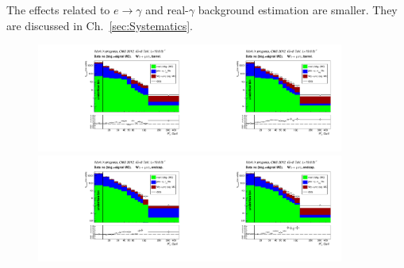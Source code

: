 The effects related to $e\rightarrow\gamma$ and real-$\gamma$ background estimation are smaller. They are discussed in Ch.~\ref{sec:Systematics}.

\begin{figure}[htb]
  \begin{center}
   \includegraphics[width=0.45\textwidth]{../figs/figs_v11/MUON_WGamma/PrepareYields/c_DATAvsBkgPlusSigMCc_MUON_WGamma_TEMPL_CHISO_UNblind__Barrel__phoEt.pdf}\includegraphics[width=0.45\textwidth]{../figs/figs_v11/MUON_WGamma/PrepareYields/c_DATAvsBkgPlusSigMCc_MUON_WGamma_TEMPL_SIHIH_UNblind__Barrel__phoEt.pdf}  \\
   \includegraphics[width=0.45\textwidth]{../figs/figs_v11/MUON_WGamma/PrepareYields/c_DATAvsBkgPlusSigMCc_MUON_WGamma_TEMPL_CHISO_UNblind__Endcap__phoEt.pdf}\includegraphics[width=0.45\textwidth]{../figs/figs_v11/MUON_WGamma/PrepareYields/c_DATAvsBkgPlusSigMCc_MUON_WGamma_TEMPL_SIHIH_UNblind__Endcap__phoEt.pdf}  \\

\end{center}
\end{figure}
